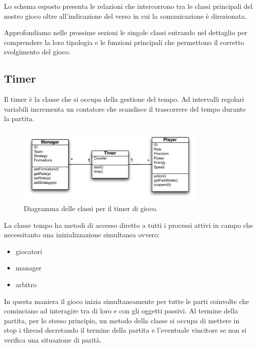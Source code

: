 \documentclass[aps,letterpaper,10pt]{article}
\begin{document}
Lo schema esposto presenta le relazioni che intercorrono tra le classi principali del nostro gioco oltre all'indicazione
del verso in cui la comunicazione \`e direzionata. \vspace{3mm}

Approfondiamo nelle prossime sezioni le singole classi entrando nel dettaglio per comprendere la loro tipologia e le
funzioni principali che permettono il corretto svolgimento del gioco.

\subsection{Timer}

Il timer \`e la classe che si occupa della gestione del tempo. Ad intervalli regolari variabili incrementa un contatore
che scandisce il trascorrere del tempo durante la partita.

\begin{figure}[H]
	\begin{center}
		\includegraphics[width=350px]{images/timer-class.pdf}
	\end{center}
\caption{Diagramma delle classi per il timer di gioco.}
\end{figure}

La classe tempo ha metodi di accesso diretto a tutti i processi attivi in campo che necessitanto una inizializzazione
simultanea ovvero:

\begin{itemize}
	\item giocatori
	\item manager
	\item arbitro
\end{itemize}

In questa maniera il gioco inizia simultaneamente per tutte le parti coinvolte che cominciano ad interagire tra di loro
e con gli oggetti passivi. Al termine della partita, per lo stesso principio, un metodo della classe si occupa di
mettere in stop i thread decretando il termine della partita e l'eventuale vincitore se non si verifica una situazione
di parit\`a.
\end{document}
